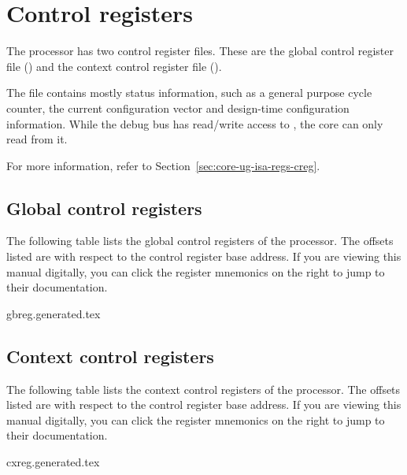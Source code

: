 
\clearpage
\section{Control registers}
\label{sec:core-ug-creg}

The \rvex{} processor has two control register files. These are the global 
control register file () and the context control register file 
().

The  file contains mostly status information, such as a general 
purpose cycle counter, the current configuration vector and design-time 
configuration information. While the debug bus has read/write access to 
, the core can only read from it.

For more information, refer to Section~\ref{sec:core-ug-isa-regs-creg}.


\subsection{Global control registers}
\label{sec:core-ug-creg-gb}

The following table lists the global control registers of the \rvex{} processor. 
The offsets listed are with respect to the control register base address. If you 
are viewing this manual digitally, you can click the register mnemonics on the 
right to jump to their documentation.

{gbreg.generated.tex}

\subsection{Context control registers}
\label{sec:core-ug-creg-cx}

The following table lists the context control registers of the \rvex{} 
processor. The offsets listed are with respect to the control register base 
address. If you are viewing this manual digitally, you can click the register 
mnemonics on the right to jump to their documentation.

{cxreg.generated.tex}

